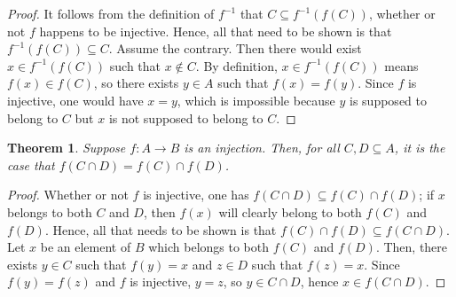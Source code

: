 \documentclass[12pt]{article}
\newtheorem{theorem}{Theorem}
\begin{document}
\begin{proof}
It follows from the definition of $f^{-1}$ that $C \subseteq f^{-1}  
(f (C))$, whether or not $f$ happens to be injective.  Hence, all that
need to be shown is that $f^{-1} (f (C)) \subseteq C$.  Assume the
contrary.  Then there would exist $x \in f^{-1} (f (C))$ such that
$x \notin C$.  By definition, $x \in f^{-1} (f (C))$ means $f(x) \in 
f(C)$, so there exists $y \in A$ such that $f(x) = f(y)$.  Since $f$
is injective, one would have $x = y$, which is impossible because
$y$ is supposed to belong to $C$ but $x$ is not supposed to belong to $C$.
\end{proof}

\begin{theorem}
Suppose $f\colon A\to B$ is an injection.  Then, for all $C, D\subseteq A$, 
it is the case that $f(C \cap D) = f(C) \cap f(D)$.
\end{theorem}

\begin{proof}
Whether or not $f$ is injective, one has $f(C \cap D) \subseteq f(C) 
\cap f(D)$; if $x$ belongs to both $C$ and $D$, then $f(x)$ will clearly
belong to both $f(C)$ and $f(D)$.  Hence, all that needs to be shown is
that $f(C) \cap f(D) \subseteq f(C \cap D)$.  Let $x$ be an element of
$B$ which belongs to both $f(C)$ and $f(D)$.  Then, there exists $y \in C$
such that $f(y) = x$ and $z \in D$ such that $f(z) = x$.  Since $f(y) = 
f(z)$ and $f$ is injective, $y = z$, so $y \in C \cap D$, hence $x \in
f(C \cap D)$.
\end{proof}
\end{document}
